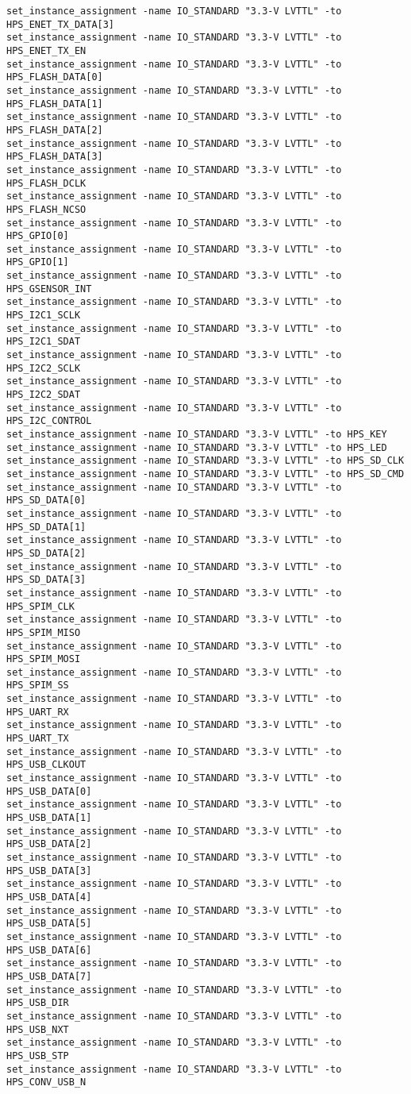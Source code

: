 \documentclass[dvipdfm]{book}
\begin{document}
\begin{verbatim}
set_instance_assignment -name IO_STANDARD "3.3-V LVTTL" -to HPS_ENET_TX_DATA[3]
set_instance_assignment -name IO_STANDARD "3.3-V LVTTL" -to HPS_ENET_TX_EN
set_instance_assignment -name IO_STANDARD "3.3-V LVTTL" -to HPS_FLASH_DATA[0]
set_instance_assignment -name IO_STANDARD "3.3-V LVTTL" -to HPS_FLASH_DATA[1]
set_instance_assignment -name IO_STANDARD "3.3-V LVTTL" -to HPS_FLASH_DATA[2]
set_instance_assignment -name IO_STANDARD "3.3-V LVTTL" -to HPS_FLASH_DATA[3]
set_instance_assignment -name IO_STANDARD "3.3-V LVTTL" -to HPS_FLASH_DCLK
set_instance_assignment -name IO_STANDARD "3.3-V LVTTL" -to HPS_FLASH_NCSO
set_instance_assignment -name IO_STANDARD "3.3-V LVTTL" -to HPS_GPIO[0]
set_instance_assignment -name IO_STANDARD "3.3-V LVTTL" -to HPS_GPIO[1]
set_instance_assignment -name IO_STANDARD "3.3-V LVTTL" -to HPS_GSENSOR_INT
set_instance_assignment -name IO_STANDARD "3.3-V LVTTL" -to HPS_I2C1_SCLK
set_instance_assignment -name IO_STANDARD "3.3-V LVTTL" -to HPS_I2C1_SDAT
set_instance_assignment -name IO_STANDARD "3.3-V LVTTL" -to HPS_I2C2_SCLK
set_instance_assignment -name IO_STANDARD "3.3-V LVTTL" -to HPS_I2C2_SDAT
set_instance_assignment -name IO_STANDARD "3.3-V LVTTL" -to HPS_I2C_CONTROL
set_instance_assignment -name IO_STANDARD "3.3-V LVTTL" -to HPS_KEY
set_instance_assignment -name IO_STANDARD "3.3-V LVTTL" -to HPS_LED
set_instance_assignment -name IO_STANDARD "3.3-V LVTTL" -to HPS_SD_CLK
set_instance_assignment -name IO_STANDARD "3.3-V LVTTL" -to HPS_SD_CMD
set_instance_assignment -name IO_STANDARD "3.3-V LVTTL" -to HPS_SD_DATA[0]
set_instance_assignment -name IO_STANDARD "3.3-V LVTTL" -to HPS_SD_DATA[1]
set_instance_assignment -name IO_STANDARD "3.3-V LVTTL" -to HPS_SD_DATA[2]
set_instance_assignment -name IO_STANDARD "3.3-V LVTTL" -to HPS_SD_DATA[3]
set_instance_assignment -name IO_STANDARD "3.3-V LVTTL" -to HPS_SPIM_CLK
set_instance_assignment -name IO_STANDARD "3.3-V LVTTL" -to HPS_SPIM_MISO
set_instance_assignment -name IO_STANDARD "3.3-V LVTTL" -to HPS_SPIM_MOSI
set_instance_assignment -name IO_STANDARD "3.3-V LVTTL" -to HPS_SPIM_SS
set_instance_assignment -name IO_STANDARD "3.3-V LVTTL" -to HPS_UART_RX
set_instance_assignment -name IO_STANDARD "3.3-V LVTTL" -to HPS_UART_TX
set_instance_assignment -name IO_STANDARD "3.3-V LVTTL" -to HPS_USB_CLKOUT
set_instance_assignment -name IO_STANDARD "3.3-V LVTTL" -to HPS_USB_DATA[0]
set_instance_assignment -name IO_STANDARD "3.3-V LVTTL" -to HPS_USB_DATA[1]
set_instance_assignment -name IO_STANDARD "3.3-V LVTTL" -to HPS_USB_DATA[2]
set_instance_assignment -name IO_STANDARD "3.3-V LVTTL" -to HPS_USB_DATA[3]
set_instance_assignment -name IO_STANDARD "3.3-V LVTTL" -to HPS_USB_DATA[4]
set_instance_assignment -name IO_STANDARD "3.3-V LVTTL" -to HPS_USB_DATA[5]
set_instance_assignment -name IO_STANDARD "3.3-V LVTTL" -to HPS_USB_DATA[6]
set_instance_assignment -name IO_STANDARD "3.3-V LVTTL" -to HPS_USB_DATA[7]
set_instance_assignment -name IO_STANDARD "3.3-V LVTTL" -to HPS_USB_DIR
set_instance_assignment -name IO_STANDARD "3.3-V LVTTL" -to HPS_USB_NXT
set_instance_assignment -name IO_STANDARD "3.3-V LVTTL" -to HPS_USB_STP
set_instance_assignment -name IO_STANDARD "3.3-V LVTTL" -to HPS_CONV_USB_N


\end{verbatim}
\end{document}
